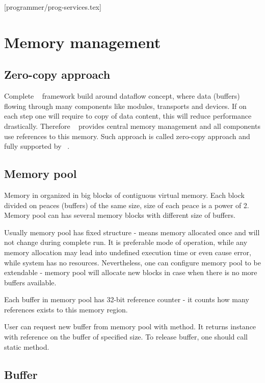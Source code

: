 [programmer/prog-services.tex]

\section{Memory management}

\subsection{Zero-copy approach}

Complete \dabc~ framework build around dataflow concept, where data (buffers) 
flowing through many components like modules, transports and devices. 
If on each step one will require to copy of data content, this will reduce 
performance drastically. Therefore \dabc~ provides central memory management
and all components use references to this memory. 
Such approach is called zero-copy approach and fully supported by \dabc~.


\subsection{Memory pool}

Memory in  organized in big blocks of contiguous virtual memory.
Each block divided on peaces (buffers) of the same size, size of each peace is a power of 2.
Memory pool can has several memory blocks with different size of buffers.

Usually memory pool has fixed structure - means memory allocated once and will not
change during complete run. It is preferable mode of operation, while any 
memory allocation may lead into undefined execution time or even cause error, while
system has no resources. Nevertheless, one can configure memory pool to be extendable -  
memory pool will allocate new blocks in case when there is no more buffers available.   

Each buffer in memory pool has 32-bit reference counter - it counts how many references
exists to this memory region.   

User can request new buffer from memory pool with  method. 
It returns  instance with reference on the buffer of specified size.
To release buffer, one should call  static method.  
 

\subsection{Buffer}

